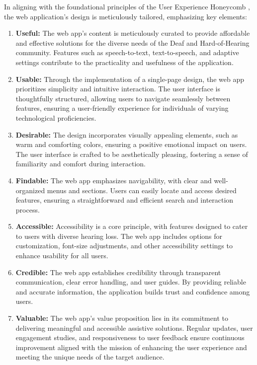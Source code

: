 \documentclass{l4proj}
\begin{document}
In aligning with the foundational principles of the User Experience Honeycomb \citep{Morville_2004}, the web application's design is meticulously tailored, emphasizing key elements:
\begin{enumerate}[{UX}.1]
    \item \textbf{Useful:} The web app's content is meticulously curated to provide affordable and effective solutions for the diverse needs of the Deaf and Hard-of-Hearing community. Features such as speech-to-text, text-to-speech, and adaptive settings contribute to the practicality and usefulness of the application.
    \item \textbf{Usable:} Through the implementation of a single-page design, the web app prioritizes simplicity and intuitive interaction. The user interface is thoughtfully structured, allowing users to navigate seamlessly between features, ensuring a user-friendly experience for individuals of varying technological proficiencies.
    \item \textbf{Desirable:} The design incorporates visually appealing elements, such as warm and comforting colors, ensuring a positive emotional impact on users. The user interface is crafted to be aesthetically pleasing, fostering a sense of familiarity and comfort during interaction.
    \item \textbf{Findable:} The web app emphasizes navigability, with clear and well-organized menus and sections. Users can easily locate and access desired features, ensuring a straightforward and efficient search and interaction process.
    \item \textbf{Accessible:} Accessibility is a core principle, with features designed to cater to users with diverse hearing loss. The web app includes options for customization, font-size adjustments, and other accessibility settings to enhance usability for all users.
    \item \textbf{Credible:} The web app establishes credibility through transparent communication, clear error handling, and user guides. By providing reliable and accurate information, the application builds trust and confidence among users.
    \item \textbf{Valuable:} The web app's value proposition lies in its commitment to delivering meaningful and accessible assistive solutions. Regular updates, user engagement studies, and responsiveness to user feedback ensure continuous improvement aligned with the mission of enhancing the user experience and meeting the unique needs of the target audience.
\end{enumerate}
\end{document}

